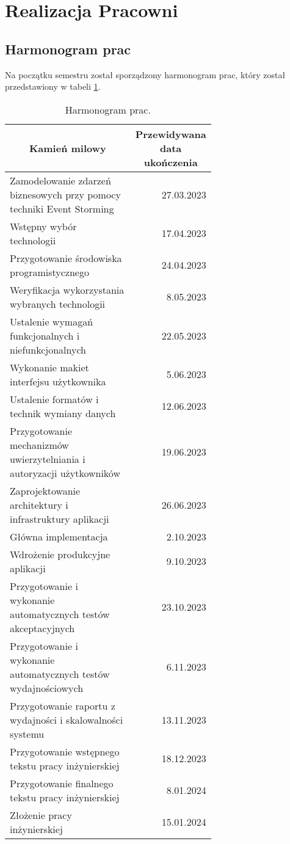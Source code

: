\clearpage %
\section{Realizacja Pracowni}

\subsection{Harmonogram prac}

Na początku semestru został sporządzony harmonogram prac, który został przedstawiony w tabeli \ref{table:harmonogram}.

\begin{longtable}{| m{0.67\linewidth} | r |}
    \caption{Harmonogram prac.}
    \label{table:harmonogram} \\

    \hline
    \multicolumn{1}{c|}{Kamień milowy} & \multicolumn{1}{c|}{Przewidywana data ukończenia} \\ \hline\hline \endfirsthead \endfoot
    \hline \endlastfoot

    Zamodelowanie zdarzeń biznesowych przy pomocy techniki Event Storming & 27.03.2023 \\ \hline
    Wstępny wybór technologii & 17.04.2023 \\ \hline
    Przygotowanie środowiska programistycznego & 24.04.2023 \\ \hline
    Weryfikacja wykorzystania wybranych technologii & 8.05.2023 \\ \hline
    Ustalenie wymagań funkcjonalnych i niefunkcjonalnych & 22.05.2023 \\ \hline
    Wykonanie makiet interfejsu użytkownika & 5.06.2023 \\ \hline
    Ustalenie formatów i technik wymiany danych & 12.06.2023 \\ \hline
    Przygotowanie mechanizmów uwierzytelniania i autoryzacji użytkowników & 19.06.2023 \\ \hline
    Zaprojektowanie architektury i infrastruktury aplikacji & 26.06.2023 \\ \hline
    Główna implementacja & 2.10.2023 \\ \hline
    Wdrożenie produkcyjne aplikacji & 9.10.2023 \\ \hline
    Przygotowanie i wykonanie automatycznych testów akceptacyjnych & 23.10.2023 \\ \hline
    Przygotowanie i wykonanie automatycznych testów wydajnościowych & 6.11.2023\\ \hline
    Przygotowanie raportu z wydajności i skalowalności systemu & 13.11.2023 \\ \hline
    Przygotowanie wstępnego tekstu pracy inżynierskiej & 18.12.2023 \\ \hline
    Przygotowanie finalnego tekstu pracy inżynierskiej & 8.01.2024 \\ \hline
    Złożenie pracy inżynierskiej & 15.01.2024 \\ \hline
\end{longtable}

